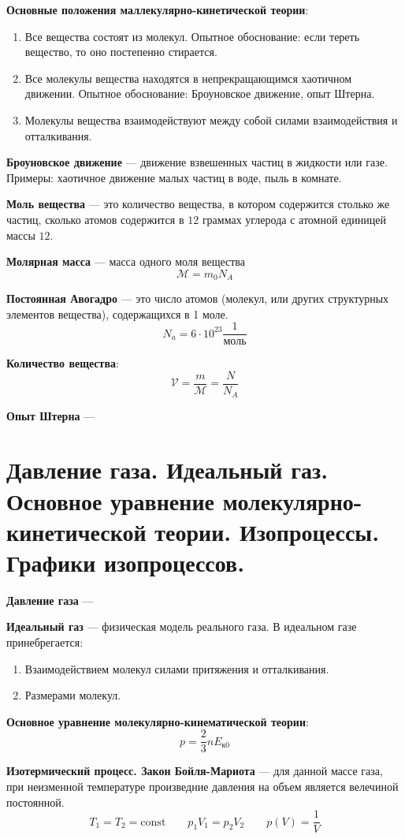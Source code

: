\documentclass{report}
\begin{document}
{\bf Основные положения маллекулярно-кинетической теории}:
\begin{enumerate}
  \item Все вещества состоят из молекул. 
  Опытное обоснование: если тереть вещество, то оно постепенно стирается.
  \item Все молекулы вещества находятся в непрекращающимся хаотичном движении.
  Опытное обоснование: Броуновское движение, опыт Штерна.
  \item Молекулы вещества взаимодействуют между собой силами взаимодействия и отталкивания.
\end{enumerate}

{\bf Броуновское движение} ---
движение взвешенных частиц в жидкости или газе. Примеры: хаотичное движение малых частиц в воде,
пыль в комнате.

{\bf Моль вещества} ---
это количество вещества, в котором содержится столько же частиц, сколько атомов 
содержится в $12$ граммах углерода с атомной единицей массы $12$. 

{\bf Молярная масса} ---
масса одного моля вещества
$$
\mathcal{M}=m_0N_A
$$

{\bf Постоянная Авогадро} ---
это число атомов (молекул, или других структурных элементов вещества), содержащихся в 1 моле.
$$
N_a=6\cdot10^{23}\frac{1}{\textrm{моль}}
$$

{\bf Количество вещества}:
$$
\mathcal{V}=\frac{m}{\mathcal{M}}=\frac{N}{N_A}
$$

{\bf Опыт Штерна} ---



\part{Давление газа. 
Идеальный газ. 
Основное уравнение молекулярно-кинетической теории.
Изопроцессы. 
Графики изопроцессов.}

{\bf Давление газа} ---

{\bf Идеальный газ} ---
физическая модель реального газа. В идеальном газе принебрегается:
\begin{enumerate}
  \item Взаимодействием молекул силами притяжения и отталкивания.
  \item Размерами молекул.
\end{enumerate}

{\bf Основное уравнение молекулярно-кинематической теории}:
$$
p=\frac{2}{3}nE_{\textrm{к}0}
$$

{\bf Изотермический процесс. Закон Бойля-Мариота} ---
для данной массе газа, при неизменной температуре произведние давления на 
объем является велечиной постоянной.
$$
T_1=T_2=\textrm{const} \qquad 
p_1V_1=p_2V_2 \qquad 
p(V)=\frac{1}{V}
$$
\end{document}
